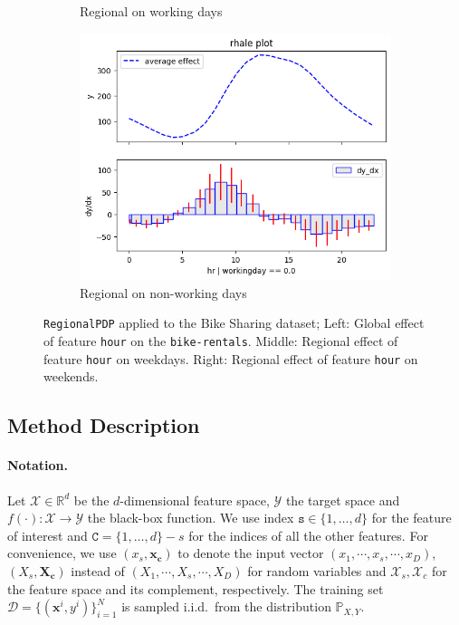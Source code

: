 \documentclass[
twocolumn,
]{ceurart}
\newcommand{\xb}{\mathbf{x}}
\newcommand{\xc}{\mathbf{x_c}}
\newcommand{\Xc}{\mathbf{X_c}}
\begin{document}
\begin{figure}
\begin{subfigure}[t]{0.32\textwidth}
  \caption{Regional on working days}
  \label{subfig:regional_a}
  \end{subfigure}
  \begin{subfigure}[t]{0.32\textwidth}
  \centering  
  \includegraphics[width=\linewidth]{figures/running_example/01_bike_sharing_dataset_29_0.png}
  \caption{Regional on non-working days}
  \label{subfig:regional_b}
  \end{subfigure}
  \caption{\texttt{RegionalPDP} applied to the Bike Sharing dataset; Left: Global effect of feature \texttt{hour} on the \texttt{bike-rentals}. Middle: Regional effect of feature \texttt{hour} on weekdays. Right: Regional effect of feature \texttt{hour} on weekends.}
  \label{fig:main-concept}
\end{figure}

\subsection{Method Description}

\paragraph{Notation.}

Let \(\mathcal{X} \in \mathbb{R}^d\) be the \(d\)-dimensional feature space, \(\mathcal{Y}\) the target space and
\(f(\cdot) : \mathcal{X} \rightarrow \mathcal{Y}\) the black-box function.
We use index \(\mathtt{s} \in \{1, \ldots, d\}\) for the feature of interest and \(\mathtt{C} = \{1, \ldots, d\} - s\) for the indices of all the other features.
For convenience, we use \((x_s, \xc)\) to denote the input vector \((x_1, \cdots , x_s, \cdots, x_D)\),
\((X_s, \Xc)\) instead of \((X_1, \cdots , X_s, \cdots, X_D)\) for random variables and
$\mathcal{X}_s, \mathcal{X}_{c}$ for the feature space and its complement, respectively.
The training set \(\mathcal{D} = \{(\xb^i, y^i)\}_{i=1}^N\) is sampled
i.i.d.\ from the distribution \(\mathbb{P}_{X,Y}\).
\end{document}
